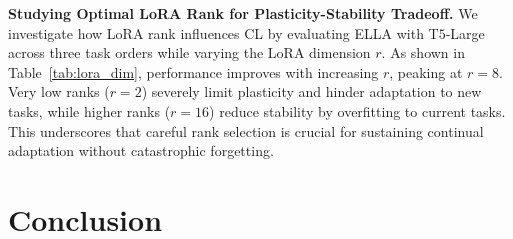 \documentclass[11pt]{article}
\begin{document}
\textbf{Studying Optimal LoRA Rank for Plasticity-Stability Tradeoff.} We investigate how LoRA rank influences CL by evaluating ELLA with T$5$-Large across three task orders while varying the LoRA dimension \(r\). As shown in Table~\ref{tab:lora_dim}, performance improves with increasing \( r \), peaking at \( r=8 \). Very low ranks (\(r=2\)) severely limit plasticity and hinder adaptation to new tasks, while higher ranks (\( r=16 \)) reduce stability by overfitting to current tasks. This underscores that careful rank selection is 
crucial for sustaining continual adaptation without catastrophic forgetting.

\section{Conclusion}
\end{document}
